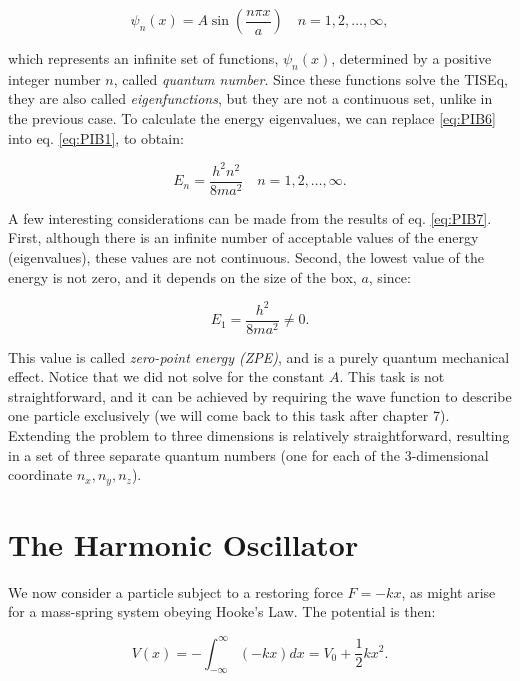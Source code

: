\documentclass[
  9pt,
]{extbook}
\theoremstyle{definition}
\theoremstyle{definition}
\theoremstyle{definition}
\theoremstyle{remark}
\begin{document}
\begin{equation}
\psi_n(x)= A\sin\left(\frac{n\pi x}{a} \right)\quad n=1,2,\ldots,\infty,
\label{eq:PIB6}
\end{equation}

which represents an infinite set of functions, \(\psi_n(x)\), determined by a positive integer number \(n\), called \emph{quantum number}. Since these functions solve the TISEq, they are also called \emph{eigenfunctions}, but they are not a continuous set, unlike in the previous case. To calculate the energy eigenvalues, we can replace \eqref{eq:PIB6} into eq. \eqref{eq:PIB1}, to obtain:

\begin{equation}
E_n = \frac{h^2 n^2}{8 m a^2} \quad n=1,2,\ldots,\infty.
\label{eq:PIB7}
\end{equation}

A few interesting considerations can be made from the results of eq. \eqref{eq:PIB7}. First, although there is an infinite number of acceptable values of the energy (eigenvalues), these values are not continuous. Second, the lowest value of the energy is not zero, and it depends on the size of the box, \(a\), since:

\begin{equation}
E_1 = \frac{h^2 }{8 m a^2} \neq 0.
\label{eq:PIB8}
\end{equation}

This value is called \emph{zero-point energy (ZPE)}, and is a purely quantum mechanical effect. Notice that we did not solve for the constant \(A\). This task is not straightforward, and it can be achieved by requiring the wave function to describe one particle exclusively (we will come back to this task after chapter 7). Extending the problem to three dimensions is relatively straightforward, resulting in a set of three separate quantum numbers (one for each of the 3-dimensional coordinate \(n_x,n_y,n_z\)).

\hypertarget{the-harmonic-oscillator}{%
\section{The Harmonic Oscillator}\label{the-harmonic-oscillator}}

We now consider a particle subject to a restoring force \(F = -kx\), as might arise for a mass-spring system obeying Hooke's Law. The potential is then:

\begin{equation}
V(x) = - \int_{-\infty}^{\infty} (-kx) dx = V_0 + \frac{1}{2} kx^2.
\label{eq:HO1}
\end{equation}
\end{document}
